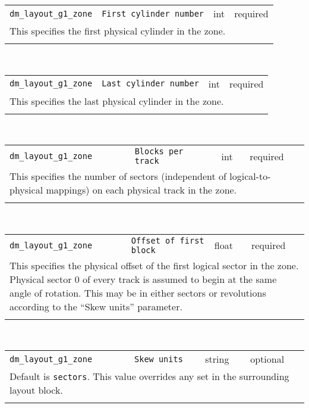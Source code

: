 \noindent 
\begin{tabular}{|p{1.5in}|p{3.5in}|p{0.5in}|p{0.5in}|}
\cline{1-4}
\texttt{dm\_layout\_g1\_zone} & \texttt{First cylinder number} & int & required \\ 
\cline{1-4}
\multicolumn{4}{|p{6in}|}{
This specifies the first physical cylinder in the zone.
}\\ 
\cline{1-4}
\multicolumn{4}{p{5in}}{}\\
\end{tabular}\\ 
\noindent 
\begin{tabular}{|p{1.5in}|p{3.5in}|p{0.5in}|p{0.5in}|}
\cline{1-4}
\texttt{dm\_layout\_g1\_zone} & \texttt{Last cylinder number} & int & required \\ 
\cline{1-4}
\multicolumn{4}{|p{6in}|}{
This specifies the last physical cylinder in the zone.
}\\ 
\cline{1-4}
\multicolumn{4}{p{5in}}{}\\
\end{tabular}\\ 
\noindent 
\begin{tabular}{|p{1.5in}|p{3.5in}|p{0.5in}|p{0.5in}|}
\cline{1-4}
\texttt{dm\_layout\_g1\_zone} & \texttt{Blocks per track} & int & required \\ 
\cline{1-4}
\multicolumn{4}{|p{6in}|}{
This specifies the number of sectors (independent of logical-to-physical
mappings) on each physical track in the zone.
}\\ 
\cline{1-4}
\multicolumn{4}{p{5in}}{}\\
\end{tabular}\\ 
\noindent 
\begin{tabular}{|p{1.5in}|p{3.5in}|p{0.5in}|p{0.5in}|}
\cline{1-4}
\texttt{dm\_layout\_g1\_zone} & \texttt{Offset of first block} & float & required \\ 
\cline{1-4}
\multicolumn{4}{|p{6in}|}{
This specifies the physical offset of the first logical sector in the
zone. Physical sector 0 of every track is assumed to begin at the
same angle of rotation. This may be in either sectors or revolutions
according to the ``Skew units'' parameter.
}\\ 
\cline{1-4}
\multicolumn{4}{p{5in}}{}\\
\end{tabular}\\ 
\noindent 
\begin{tabular}{|p{1.5in}|p{3.5in}|p{0.5in}|p{0.5in}|}
\cline{1-4}
\texttt{dm\_layout\_g1\_zone} & \texttt{Skew units} & string & optional \\ 
\cline{1-4}
\multicolumn{4}{|p{6in}|}{
Default is \texttt{sectors}. This value overrides any set in the
surrounding layout block.
}\\ 
\cline{1-4}
\multicolumn{4}{p{5in}}{}\\
\end{tabular}\\ 
